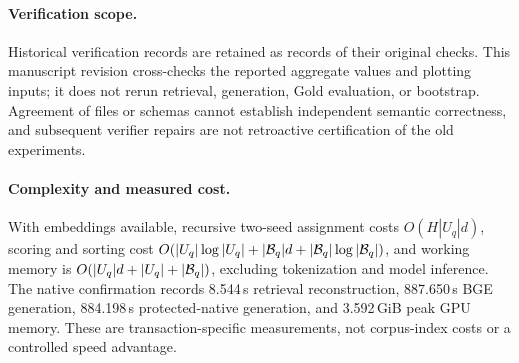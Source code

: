 \documentclass[11pt]{article}
\begin{document}
\paragraph{Verification scope.}
Historical verification records are retained as records of their original
checks. This manuscript revision cross-checks the reported aggregate values
and plotting inputs; it does not rerun retrieval, generation, Gold evaluation,
or bootstrap. Agreement of files or schemas cannot establish independent
semantic correctness, and subsequent verifier repairs are not retroactive
certification of the old experiments.

\paragraph{Complexity and measured cost.}
With embeddings available, recursive two-seed assignment costs
$O(H|U_q|d)$, scoring and sorting cost
$O(|U_q|\log|U_q|+|{\cal B}_q|d+|{\cal B}_q|\log|{\cal B}_q|)$,
and working memory is $O(|U_q|d+|U_q|+|{\cal B}_q|)$, excluding tokenization
and model inference. The native confirmation records 8.544\,s retrieval
reconstruction, 887.650\,s BGE generation, 884.198\,s protected-native
generation, and 3.592\,GiB peak GPU memory. These are transaction-specific
measurements, not corpus-index costs or a controlled speed advantage.
\end{document}
